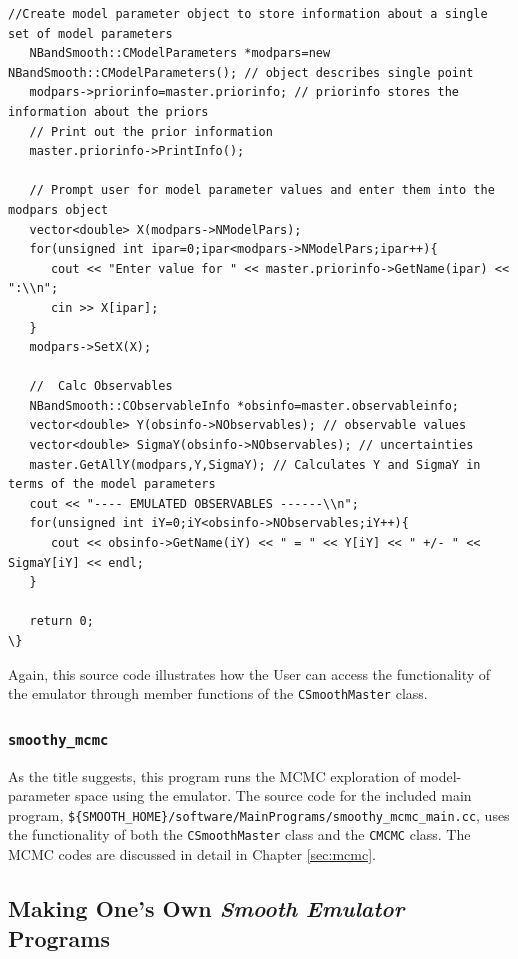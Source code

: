 \documentclass[UserManual.tex]{subfiles}
\begin{document}
\begin{sloppypar}
{\begin{Verbatim}[commandchars=\\\{\}]
   //Create model parameter object to store information about a single set of model parameters
   NBandSmooth::CModelParameters *modpars=new NBandSmooth::CModelParameters(); // object describes single point
   modpars->priorinfo=master.priorinfo; // priorinfo stores the information about the priors
   // Print out the prior information
   master.priorinfo->PrintInfo();
   
   // Prompt user for model parameter values and enter them into the modpars object
   vector<double> X(modpars->NModelPars);
   for(unsigned int ipar=0;ipar<modpars->NModelPars;ipar++){
      cout << "Enter value for " << master.priorinfo->GetName(ipar) << ":\\n";
      cin >> X[ipar];
   }
   modpars->SetX(X);
   
   //  Calc Observables
   NBandSmooth::CObservableInfo *obsinfo=master.observableinfo;
   vector<double> Y(obsinfo->NObservables); // observable values
   vector<double> SigmaY(obsinfo->NObservables); // uncertainties
   master.GetAllY(modpars,Y,SigmaY); // Calculates Y and SigmaY in terms of the model parameters
   cout << "---- EMULATED OBSERVABLES ------\\n";
   for(unsigned int iY=0;iY<obsinfo->NObservables;iY++){
      cout << obsinfo->GetName(iY) << " = " << Y[iY] << " +/- " << SigmaY[iY] << endl;
   }
   
   return 0;
\}
\end{Verbatim}
}\vspace*{-8pt}
Again, this source code illustrates how the User can access the functionality of the emulator through member functions of the {\tt CSmoothMaster} class.

\subsubsection{{\tt smoothy\_mcmc}}
As the title suggests, this program runs the MCMC exploration of model-parameter space using the emulator. The source code for the included main program, {\tt \$\{SMOOTH\_HOME\}/software/MainPrograms/smoothy\_mcmc\_main.cc}, uses the functionality of both the {\tt CSmoothMaster} class and the {\tt CMCMC} class. The MCMC codes are discussed in detail in Chapter \ref{sec:mcmc}.

\subsection{Making One's Own {\it Smooth Emulator} Programs}


\end{sloppypar}
\end{document}
